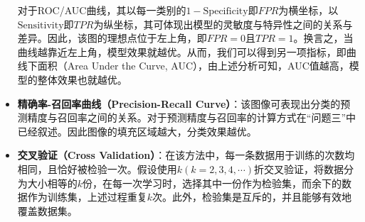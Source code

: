 \documentclass{MathorCupmodeling}
\begin{document}
\begin{itemize}
		对于ROC/AUC曲线，其以每一类别的$1-\mathrm{Specificity}$即$FPR$为横坐标，以$\mathrm{Sensitivity}$即$TPR$为纵坐标，其可体现出模型的灵敏度与特异性之间的关系与差异。因此，该图的理想点位于左上角，即$FPR=0$且$TPR=1$。换言之，当曲线越靠近左上角，模型效果就越优。从而，我们可以得到另一项指标，即曲线下面积（Area Under the Curve, AUC），由上述分析可知，AUC值越高，模型的整体效果也就越优。
		\item \textbf{精确率-召回率曲线（Precision-Recall Curve）}：该图像可表现出分类的预测精度与召回率之间的关系\textcolor{blue}{\cite{Yellowbrick}}。对于预测精度与召回率的计算方式在“问题三”中已经叙述。因此图像的填充区域越大，分类效果越优。
		\item \textbf{交叉验证（Cross Validation）}：在该方法中，每一条数据用于训练的次数均相同，且恰好被检验一次。假设使用$k(k=2,3,4,\cdots)$折交叉验证，将数据分为大小相等的$k$份，在每一次学习时，选择其中一份作为检验集，而余下的数据作为训练集，上述过程重复$k$次。此外，检验集是互斥的，并且能够有效地覆盖数据集\textcolor{blue}{\cite{数据挖掘导论}}。
	\end{itemize}
\end{document}
